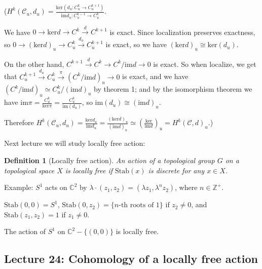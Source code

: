 \documentclass{article}
\theoremstyle{mystyle}
\newtheorem*{definition}{Definition}%
\theoremstyle{remark}
\numberwithin{equation}{section}
\begin{document}
($H^k(\mathcal{C}_u,d_u) = \frac{\mathrm{ker}(d_u\colon C^k_u\rightarrow C^{k+1}_u)}{\mathrm{im}d_u\colon C^{k-1}_u\rightarrow C^k_u}$. %

We have $0\rightarrow \mathrm{ker} d \rightarrow C^k\xrightarrow{d} C^{k+1}$ is exact. Since localization preserves exactness, so  $0\rightarrow (\mathrm{ker}d)_u\rightarrow C^k_u\xrightarrow{d_u} C^{k+1}_u$ is exact, so we have $(\mathrm{ker}d)_u \cong \mathrm{ker}(d_u)$.

On the other hand, $C^{k+1}\xrightarrow{d}C^k \rightarrow C^k/\mathrm{im}d \rightarrow 0$ is exact. So when localize, we get that $C^{k+1}_u\xrightarrow{d_u}C^k_u \xrightarrow{\pi} (C^k/\mathrm{im}d)_u \rightarrow 0$ is exact, and we have $(C^k/\mathrm{im} d)_u\simeq C^k_u/(\mathrm{im}d)_u$ by theorem 1; and by the isomorphism theorem we have $\mathrm{im}\pi = \frac{C^k_u}{\mathrm{ker}\pi} = \frac{C^k_u}{\mathrm{im}(d_u)}$, so $\mathrm{im}(d_u)\cong (\mathrm{im}d)_u$.

Therefore $H^k(\mathcal{C}_u,d_u) = \frac{\mathrm{ker}d_u}{\mathrm{im}d_u} = \frac{(\mathrm{ker}d)_u}{(\mathrm{im}d)_u}
 \simeq \left(\frac{\mathrm{ker}}{\mathrm{im} d}\right)_u = H^k(\mathcal{C},d)_u$.)






Next lecture we will study locally free action:

\begin{definition}[Locally free action]
An action of a topological group $G$ on a topological space $X$ is \emph{locally free} if $\mathrm{Stab}(x)$ is discrete for any $x\in X$.
\end{definition}



Example: $S^1$ acts on $\mathbb{C}^2$ by $\lambda\cdot(z_1,z_2) = (\lambda z_1,\lambda^nz_2)$, where $n \in \mathbb{Z}^+$. 

$\mathrm{Stab}(0,0) = S^1$, $\mathrm{Stab}(0,z_2) = \{n\text{-th roots of }1\}$ if $z_2\neq 0$, and $\mathrm{Stab}(z_1,z_2) = 1$ if $z_1\neq 0$. 

The action of $S^1$ on $\mathbb{C}^2-\{(0,0)\}$ is locally free. 




\subsection{Lecture 24: Cohomology of a locally free action}
\end{document}
